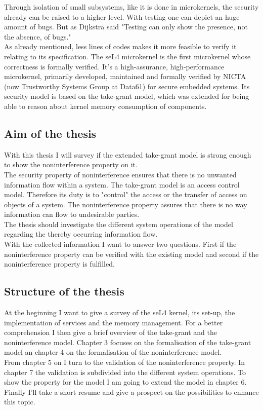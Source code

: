 Through isolation of small subsystems, like it is done in microkernels, the security already can be raised to a higher level. With testing one can depict an huge amount of bugs. But as Dijkstra said "Testing can only show the presence, not the absence, of bugs." \cite{EngTec} \\
As already mentioned, less lines of codes makes it more feasible to verify it relating to its specification. 
The seL4 microkernel is the first microkernel whose correctness is formally verified. It's a high-assurance, high-performance microkernel, primarily developed, maintained and formally verified by NICTA (now Trustworthy Systems Group at Data61) for secure embedded systems. Its security model is based on the take-grant model, which was extended for being able to reason about kernel memory consumption of components. 
	\subsection{Aim of the thesis}
	With this thesis I will survey if the extended take-grant model is strong enough to show the noninterference property on it. \\
	The security property of noninterference ensures that there is no unwanted information flow within a system. The take-grant model is an access control model. Therefore its duty is to "control" the access or the transfer of access on objects of a system. The noninterference property assures that there is no way information can flow to undesirable parties. \\
The thesis should investigate the different system operations of the model regarding the thereby occurring information flow. \\
With the collected information I want to answer two questions. First if the noninterference property can be verified with the existing model and second if the noninterference property is fulfilled. 
\subsection{Structure of the thesis}
At the beginning I want to give a survey of the seL4 kernel, its set-up, the implementation of services and the memory management. For a better comprehension I then give a brief overview of the take-grant and the noninterference model. 
Chapter 3 focuses on the formalisation of the take-grant model an chapter 4 on the formalisation of the noninterference model. \\
From chapter 5 on I turn to the validation of the noninterference property. In chapter 7 the validation is subdivided into the different system operations. To show the property for the model I am going to extend the model in chapter 6. \\
Finally I'll take a short resume and give a prospect on the possibilities to enhance this topic.